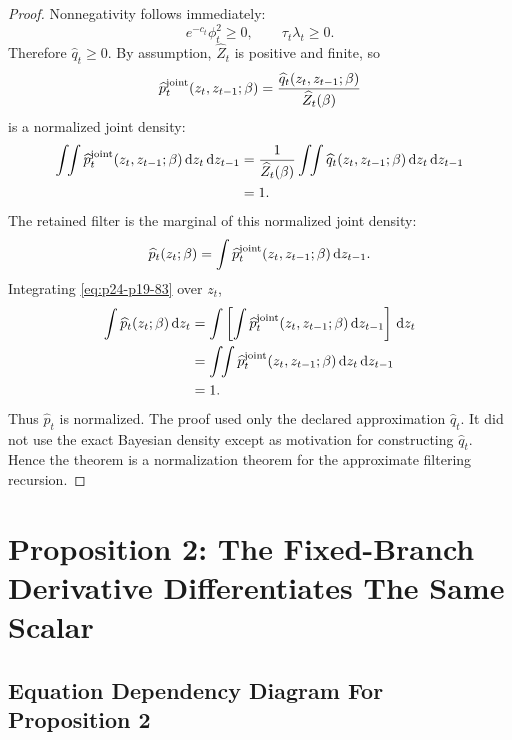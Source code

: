 \documentclass[11pt]{article}
\newcommand{\dd}{\,\mathrm d}
\begin{document}
\begin{proof}
Nonnegativity follows immediately:
\[
    e^{-c_t}\phi_t^2\ge0,
    \qquad
    \tau_t\lambda_t\ge0.
    \label{eq:p24-p19-80}
\]
Therefore \(\widehat q_t\ge0\).  By assumption,
\(\widehat Z_t\) is positive and finite, so
\[
    \widehat p_t^{\rm joint}(z_t,z_{t-1};\beta)
    =
    \frac{\widehat q_t(z_t,z_{t-1};\beta)}
    {\widehat Z_t(\beta)}
    \label{eq:p24-p19-81}
\]
is a normalized joint density:
\[
\begin{aligned}
    \int\!\!\int
    \widehat p_t^{\rm joint}(z_t,z_{t-1};\beta)
    \dd z_t\dd z_{t-1}
    &=
    \frac{1}{\widehat Z_t(\beta)}
    \int\!\!\int
    \widehat q_t(z_t,z_{t-1};\beta)
    \dd z_t\dd z_{t-1}\\
    &=
    1.
\end{aligned}
\label{eq:p24-p19-82}
\]
The retained filter is the marginal of this normalized joint density:
\[
    \widehat p_t(z_t;\beta)
    =
    \int
    \widehat p_t^{\rm joint}(z_t,z_{t-1};\beta)
    \dd z_{t-1}.
    \label{eq:p24-p19-83}
\]
Integrating \eqref{eq:p24-p19-83} over \(z_t\),
\[
\begin{aligned}
    \int \widehat p_t(z_t;\beta)\dd z_t
    &=
    \int
    \left[
    \int \widehat p_t^{\rm joint}(z_t,z_{t-1};\beta)
    \dd z_{t-1}
    \right]\dd z_t\\
    &=
    \int\!\!\int
    \widehat p_t^{\rm joint}(z_t,z_{t-1};\beta)
    \dd z_t\dd z_{t-1}\\
    &=
    1.
\end{aligned}
\label{eq:p24-p19-84}
\]
Thus \(\widehat p_t\) is normalized.  The proof used only the declared
approximation \(\widehat q_t\).  It did not use the exact Bayesian density
except as motivation for constructing \(\widehat q_t\).  Hence the theorem is a
normalization theorem for the approximate filtering recursion.
\end{proof}

\section{Proposition 2: The Fixed-Branch Derivative Differentiates The Same Scalar}

\subsection*{Equation Dependency Diagram For Proposition 2}
\end{document}
